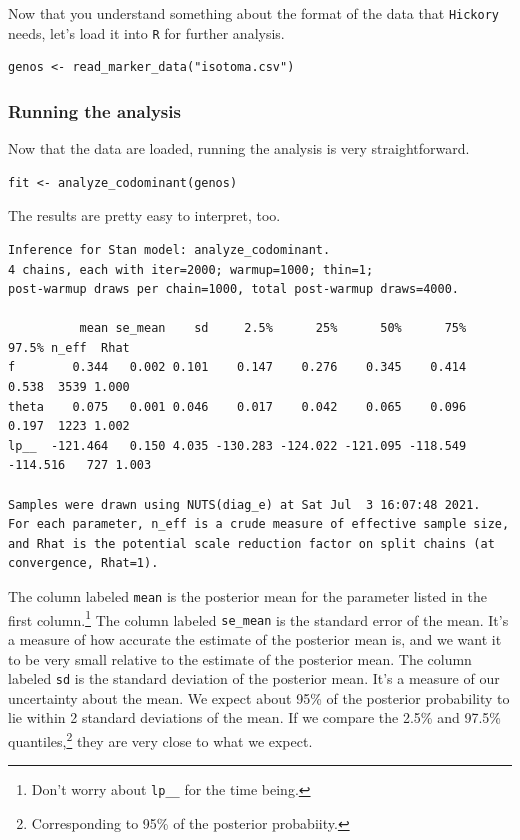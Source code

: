 \documentclass[12pt]{article}
\begin{document}
Now that you understand something about the format of the data that
{\tt Hickory} needs, let's load it into {\tt R} for further analysis.

\begin{verbatim}
genos <- read_marker_data("isotoma.csv")
\end{verbatim}

\subsubsection*{Running the analysis}

Now that the data are loaded, running the analysis is very
straightforward.

\begin{verbatim}
fit <- analyze_codominant(genos)
\end{verbatim}
The results are pretty easy to interpret, too.
{\small
\begin{verbatim}
Inference for Stan model: analyze_codominant.
4 chains, each with iter=2000; warmup=1000; thin=1; 
post-warmup draws per chain=1000, total post-warmup draws=4000.

          mean se_mean    sd     2.5%      25%      50%      75%    97.5% n_eff  Rhat
f        0.344   0.002 0.101    0.147    0.276    0.345    0.414    0.538  3539 1.000
theta    0.075   0.001 0.046    0.017    0.042    0.065    0.096    0.197  1223 1.002
lp__  -121.464   0.150 4.035 -130.283 -124.022 -121.095 -118.549 -114.516   727 1.003

Samples were drawn using NUTS(diag_e) at Sat Jul  3 16:07:48 2021.
For each parameter, n_eff is a crude measure of effective sample size,
and Rhat is the potential scale reduction factor on split chains (at 
convergence, Rhat=1).
\end{verbatim}
}
The column labeled {\tt mean} is the posterior mean for the parameter
listed in the first column.\footnote{Don't worry about {\tt lp\_\_}
for the time being.} The column labeled {\tt se\_mean} is the standard
error of the mean. It's a measure of how accurate the estimate of the
posterior mean is, and we want it to be very small relative to the
estimate of the posterior mean. The column labeled {\tt sd} is the
standard deviation of the posterior mean. It's a measure of our
uncertainty about the mean. We expect about 95\% of the posterior
probability to lie within 2 standard deviations of the mean. If we
compare the 2.5\% and 97.5\% quantiles,\footnote{Corresponding to 95\%
  of the posterior probabiity.} they are very close to what we expect.
\end{document}
